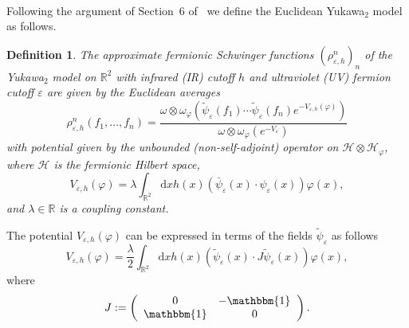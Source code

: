 \documentclass{article}
\newcommand{\assign}{:=}
\newcommand{\mathd}{\mathrm{d}}
\newtheorem{definition}[theorem]{Definition}
\begin{document}
\

Following the argument of Section~6 of~{\cite{osterwalder_euclidean_1973-2}}
we define the Euclidean Yukawa$_2$ model as follows.

\begin{definition}
  \label{def:yukawa2}The approximate fermionic Schwinger functions
  $(\rho^n_{\varepsilon, h})_n$ of the Yukawa$_2$ model on $\mathbb{R}^2$ with
  infrared (IR) cutoff $h$ and ultraviolet (UV) fermion cutoff $\varepsilon$
  are given by the Euclidean averages
  \begin{equation}
    \rho^n_{\varepsilon, h} (f_1, \ldots, f_n) = \frac{\omega \otimes
    \omega_{\varphi} (\tilde{\psi}_{\varepsilon} (f_1) \cdots
    \tilde{\psi}_{\varepsilon} (f_n) e^{- V_{\varepsilon, h}
    (\varphi)})}{\omega \otimes \omega_{\varphi} (e^{- V_{\varepsilon}})}
    \label{eq:euclidean-yukawa-main}
  \end{equation}
  with potential given by the unbounded (non-self-adjoint) operator on
  $\mathcal{H} \otimes \mathcal{H}_{\varphi}$, where $\mathcal{H}$ is the
  fermionic Hilbert space,
  \begin{equation}
    V_{\varepsilon, h} (\varphi) = \lambda \int_{\mathbb{R}^2} \mathd x h (x)
    (\bar{\psi}_{\varepsilon} (x) \cdot \psi_{\varepsilon} (x)) \varphi (x),
    \label{eq:yukawa-potential-boson}
  \end{equation}
  and $\lambda \in \mathbb{R}$ is a coupling constant.
\end{definition}

The potential $V_{\varepsilon, h} (\varphi)$ can be expressed in terms of the
fields $\tilde{\psi}_{\varepsilon}$ as follows
\[ V_{\varepsilon, h} (\varphi) = \frac{\lambda}{2} \int_{\mathbb{R}^2} \mathd
   x h (x) (\tilde{\psi}_{\varepsilon} (x) \cdot J
   \widetilde{\psi}_{\varepsilon} (x)) \varphi (x), \]
where
\[ J \assign \left( \begin{array}{cc}
     0 & -\mathbbm{1}_{}\\
     \mathbbm{1} & 0
   \end{array} \right) . \]
$\text{}$
\end{document}
